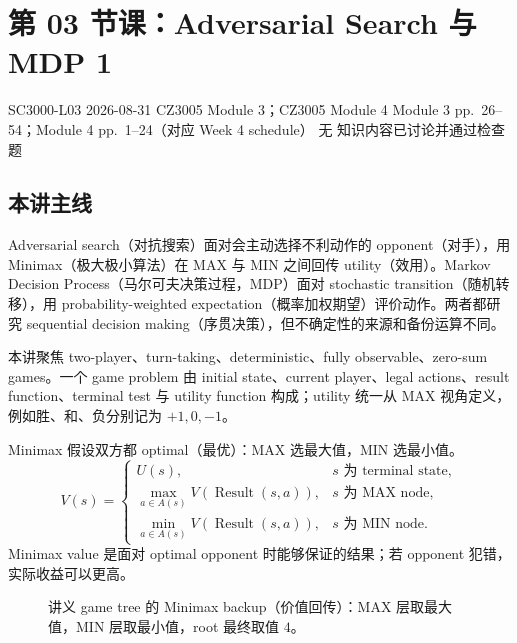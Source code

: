 
\section{第 03 节课：Adversarial Search 与 MDP 1}
\label{lecture:SC3000-L03}

\lecturemeta
  {SC3000-L03}
  {2026-08-31}
  {CZ3005 Module 3；CZ3005 Module 4}
  {Module 3 pp.~26--54；Module 4 pp.~1--24（对应 Week 4 schedule）}
  {无}
  {知识内容已讨论并通过检查题}

\subsection{本讲主线}

Adversarial search（对抗搜索）面对会主动选择不利动作的 opponent（对手），用 Minimax（极大极小算法）在 MAX 与 MIN 之间回传 utility（效用）。Markov Decision Process（马尔可夫决策过程，MDP）面对 stochastic transition（随机转移），用 probability-weighted expectation（概率加权期望）评价动作。两者都研究 sequential decision making（序贯决策），但不确定性的来源和备份运算不同。


本讲聚焦 two-player、turn-taking、deterministic、fully observable、zero-sum games。一个 game problem 由 initial state、current player、legal actions、result function、terminal test 与 utility function 构成；utility 统一从 MAX 视角定义，例如胜、和、负分别记为 $+1,0,-1$。

Minimax 假设双方都 optimal（最优）：MAX 选最大值，MIN 选最小值。
\[
  V(s)=
  \begin{cases}
    U(s), & s\text{ 为 terminal state},\\
    \displaystyle\max_{a\in A(s)}V(\operatorname{Result}(s,a)),
      & s\text{ 为 MAX node},\\
    \displaystyle\min_{a\in A(s)}V(\operatorname{Result}(s,a)),
      & s\text{ 为 MIN node}.
  \end{cases}
\]
Minimax value 是面对 optimal opponent 时能够保证的结果；若 opponent 犯错，实际收益可以更高。

\begin{figure}[htbp]
  \centering
  \resizebox{0.96\textwidth}{!}{}
  \caption{讲义 game tree 的 Minimax backup（价值回传）：MAX 层取最大值，MIN 层取最小值，root 最终取值 $4$。}
  \label{fig:sc3000-l03-minimax-tree}
\end{figure}

